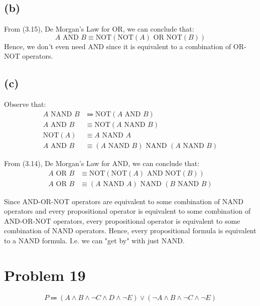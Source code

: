 \documentclass{article}
\begin{document}
\subsection{(b)}
From (3.15), De Morgan's Law for OR, we can conclude that:
\[
	A \text{ AND } B \equiv \text{NOT}(\text{NOT}(A) \text{ OR } \text{NOT}(B))
\]
Hence, we don't even need AND since it is equivalent to a combination of OR-NOT operators.

\subsection{(c)}
Observe that:
\begin{align*}
	A \text{ NAND } B & \Coloneqq \text{NOT}(A \text{ AND } B)                       \\
	A \text{ AND } B  & \equiv \text{NOT}(A \text{ NAND } B)                         \\
	\text{NOT}(A)     & \equiv A \text{ NAND } A                                     \\
	A \text{ AND } B  & \equiv (A \text{ NAND } B) \text{ NAND } (A \text{ NAND } B)
\end{align*}

From (3.14), De Morgan's Law for AND, we can conclude that:
\begin{align*}
	A \text{ OR } B & \equiv \text{NOT}(\text{NOT}(A) \text{ AND } \text{NOT}(B))  \\
	A \text{ OR } B & \equiv (A \text{ NAND } A) \text{ NAND } (B \text{ NAND } B)
\end{align*}

Since AND-OR-NOT operators are equivalent to some combination of NAND operators and every propositional operator is equivalent to some combination of AND-OR-NOT operators, every propositional operator is equivalent to some combination of NAND operators. Hence, every propositional formula is equivalent to a NAND formula. I.e. we can "get by" with just NAND.

\pagebreak

\section{Problem 19}
\[
	P \Coloneqq (A \land B \land \neg C \land D \land \neg E) \lor (\neg A \land B \land \neg C \land \neg E)
\]
\end{document}

